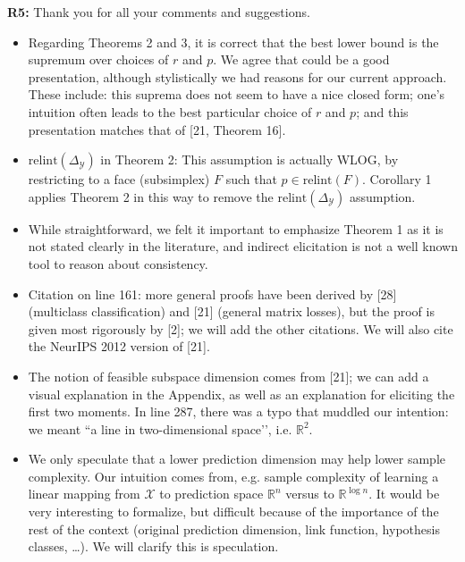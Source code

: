 \documentclass{article}
\newcommand{\reals}{\mathbb{R}}
\newcommand{\X}{\mathcal{X}}
\newcommand{\Y}{\mathcal{Y}}
\begin{document}
\textbf{R5:} Thank you for all your comments and suggestions.
\begin{itemize}[itemsep=1pt,topsep=0pt]
\item 
Regarding Theorems 2 and 3, it is correct that the best lower bound is the supremum over choices of $r$ and $p$. We agree that could be a good presentation, although stylistically we had reasons for our current approach. These include: this suprema does not seem to have a nice closed form; one’s intuition often leads to the best particular choice of $r$ and $p$; and this presentation matches that of [21, Theorem 16].

\item 
$\mathrm{relint}(\Delta_\Y)$ in Theorem 2: This assumption is actually WLOG, by restricting to a face (subsimplex) $F$ such that $p\in\mathrm{relint}(F)$. Corollary 1 applies Theorem 2 in this way to remove the $\mathrm{relint}(\Delta_\Y)$ assumption.

\item 
  While straightforward, we felt it important to emphasize Theorem 1 as it is not stated clearly in the literature, and indirect elicitation is not a well known tool to reason about consistency.

\item 
Citation on line 161: more general proofs have been derived by [28] (multiclass classification) and [21] (general matrix losses), but the proof is given most rigorously by [2]; we will add the other citations. We will also cite the NeurIPS 2012 version of [21].

\item 
The notion of feasible subspace dimension comes from [21]; we can add a visual explanation in the Appendix, as well as an explanation for eliciting the first two moments.  In line 287, there was a typo that muddled our intention: we meant ``a line in two-dimensional space’’, i.e. $\reals^2$.

\item 
We only speculate that a lower prediction dimension may help lower sample complexity. Our intuition comes from, e.g. sample complexity of learning a linear mapping from $\X$ to prediction space $\reals^n$ versus to $\reals^{\log n}$. It would be very interesting to formalize, but difficult because of the importance of the rest of the context (original prediction dimension, link function, hypothesis classes, …). We will clarify this is speculation.
\end{itemize}
\end{document}
